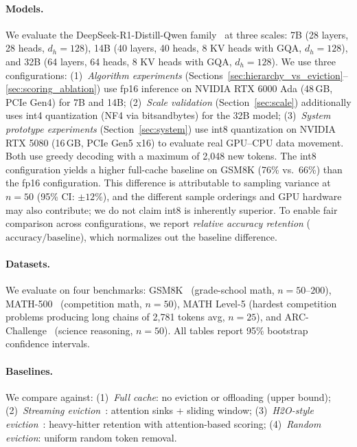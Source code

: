 \documentclass{article}
\begin{document}
\paragraph{Models.} We evaluate the DeepSeek-R1-Distill-Qwen family~\cite{deepseekr1} at three scales:
7B (28 layers, 28 heads, $d_h{=}128$),
14B (40 layers, 40 heads, 8 KV heads with GQA, $d_h{=}128$), and
32B (64 layers, 64 heads, 8 KV heads with GQA, $d_h{=}128$).
We use three configurations: (1)~\emph{Algorithm experiments} (Sections~\ref{sec:hierarchy_vs_eviction}--\ref{sec:scoring_ablation}) use fp16 inference on NVIDIA RTX 6000 Ada (48\,GB, PCIe Gen4) for 7B and 14B; (2)~\emph{Scale validation} (Section~\ref{sec:scale}) additionally uses int4 quantization (NF4 via bitsandbytes) for the 32B model; (3)~\emph{System prototype experiments} (Section~\ref{sec:system}) use int8 quantization on NVIDIA RTX 5080 (16\,GB, PCIe Gen5 x16) to evaluate real GPU--CPU data movement.
Both use greedy decoding with a maximum of 2,048 new tokens.
The int8 configuration yields a higher full-cache baseline on GSM8K (76\% vs.\ 66\%) than the fp16 configuration.
This difference is attributable to sampling variance at $n{=}50$ (95\% CI: $\pm12\%$), and the different sample orderings and GPU hardware may also contribute; we do not claim int8 is inherently superior.
To enable fair comparison across configurations, we report \emph{relative accuracy retention} ($\text{accuracy}/\text{baseline}$), which normalizes out the baseline difference.

\paragraph{Datasets.} We evaluate on four benchmarks:
GSM8K~\cite{gsm8k} (grade-school math, $n{=}50$--$200$),
MATH-500~\cite{math} (competition math, $n{=}50$),
MATH Level-5 (hardest competition problems producing long chains of 2,781 tokens avg, $n{=}25$),
and ARC-Challenge~\cite{arc} (science reasoning, $n{=}50$).
All tables report 95\% bootstrap confidence intervals.

\paragraph{Baselines.} We compare against:
(1)~\emph{Full cache}: no eviction or offloading (upper bound);
(2)~\emph{Streaming eviction}~\cite{streamingllm}: attention sinks + sliding window;
(3)~\emph{H2O-style eviction}~\cite{h2o}: heavy-hitter retention with attention-based scoring;
(4)~\emph{Random eviction}: uniform random token removal.
\end{document}
